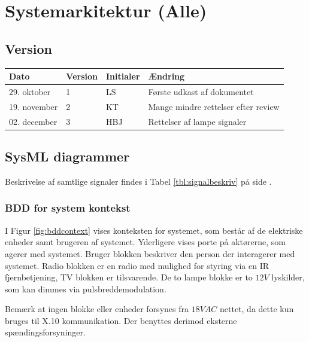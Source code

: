 \chapter{Systemarkitektur (Alle)}

\section{Version}
\begin{table}[h]
	\centering
	\begin{tabularx}{\textwidth - 2cm}{|l|l| l|X|}
	\hline
	Dato	& Version	& Initialer & Ændring	\\ \hline
	29. oktober & 1 & LS	& Første udkast af dokumentet \\ \hline
	19. november & 2 & KT & Mange mindre rettelser efter review \\ \hline
	02. december & 3 & HBJ & Rettelser af lampe signaler \\ \hline
	\end{tabularx}
\end{table}

\section{SysML diagrammer}
Beskrivelse af samtlige signaler findes i Tabel \ref{tbl:signalbeskriv} på side \pageref{tbl:signalbeskriv}.

\subsection{BDD for system kontekst}

I Figur \ref{fig:bddcontext} vises konteksten for systemet, som består af de elektriske enheder samt brugeren af systemet. Yderligere vises porte på aktørerne, som agerer med systemet. Bruger blokken beskriver den person der interagerer med systemet. Radio blokken er en radio med mulighed for styring via en IR fjernbetjening, TV blokken er tilsvarende. De to lampe blokke er to $12V$ lyskilder, som kan dimmes via pulsbreddemodulation.

Bemærk at ingen blokke eller enheder forsynes fra $18 VAC$ nettet, da dette kun bruges til X.10 kommunikation. Der benyttes derimod eksterne spændingsforsyninger.

